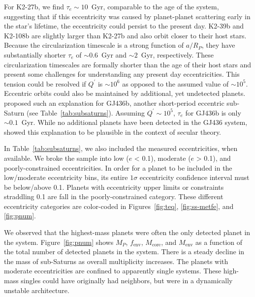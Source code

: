 \documentclass[preprint2]{aastex6}
\newcommand{\Mp}{\ensuremath{M_{P}}\xspace}
\newcommand{\Mcore}{\ensuremath{M_{\mathrm{core}}}\xspace}
\newcommand{\Menv}{\ensuremath{M_{\mathrm{env}}}\xspace}
\newcommand{\fenv}{\ensuremath{f_{\mathrm{env}}}\xspace}
\newcommand{\Qprime}{\ensuremath{Q^{\prime}}\xspace}
\newcommand{\Rp}{\ensuremath{R_P}\xspace}
\begin{document}
For K2-27b, we find $\tau_e \sim 10$~Gyr, comparable to the age of the system, suggesting that if this eccentricity was caused by planet-planet scattering early in the star's lifetime, the eccentricity could persist to the present day. K2-39b and K2-108b are slightly larger than K2-27b and also orbit closer to their host stars. Because the circularization timescale is a strong function of $a/\Rp$, they have substantially shorter $\tau_e$ of $\sim 0.6$~Gyr and $\sim2$~Gyr, respectively. These circularization timescales are formally shorter than the age of their host stars and present some challenges for understanding any present day eccentricities. This tension could be resolved if \Qprime is $\sim10^6$ as opposed to the assumed value of $\sim10^5$. Eccentric orbits could also be maintained by additional, yet undetected planets. \cite{Deming07} proposed such an explanation for GJ436b, another short-period eccentric sub-Saturn (see Table~\ref{tab:subsaturns}). Assuming $\Qprime\sim10^5$, $\tau_e$ for GJ436b is only $\sim 0.1$~Gyr. While no additional planets have been detected in the GJ436 system, \cite{Batygin09} showed this explanation to be plausible in the context of secular theory.

In Table~\ref{tab:subsaturns}, we also included the measured eccentricities, when available.  We broke the sample into low ($e$ < 0.1), moderate ($e$ > 0.1), and poorly-constrained eccentricities. In order for a planet to be included in the low/moderate eccentricity bins, its entire $1\sigma$ eccentricity confidence interval must be below/above 0.1. Planets with eccentricity upper limits or constraints straddling 0.1 are fall in the poorly-constrained category. These different eccentricity categories are color-coded in Figures~\ref{fig:teq}, \ref{fig:ss-metfe}, and \ref{fig:pnum}.

We observed that the highest-mass planets were often the only detected planet in the system. Figure~\ref{fig:pnum} shows \Mp, \fenv, \Mcore, and \Menv as a function of the total number of detected planets in the system. There is a steady decline in the mass of sub-Saturns as overall multiplicity increases. The planets with moderate eccentricities are confined to apparently single systems. These high-mass singles could have originally had neighbors, but were in a dynamically unstable architecture. 
\end{document}
